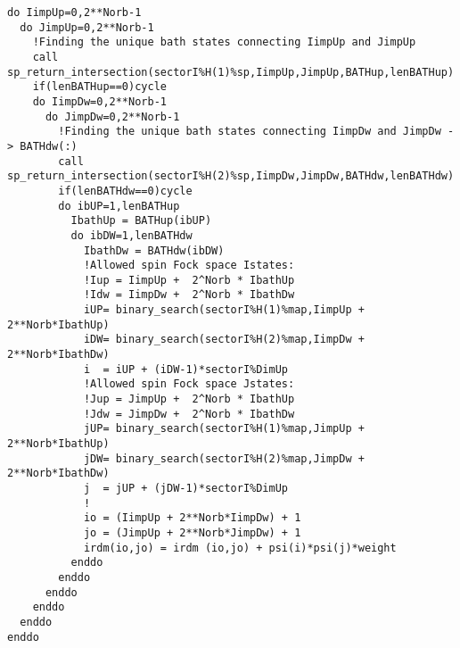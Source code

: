 \documentclass[edipack2.tex]{subfiles}
\begin{document}
\begin{lstlisting}[style=fstyle,numbers=none,basicstyle={\scriptsize\ttfamily}]
do IimpUp=0,2**Norb-1
  do JimpUp=0,2**Norb-1
    !Finding the unique bath states connecting IimpUp and JimpUp
    call sp_return_intersection(sectorI%H(1)%sp,IimpUp,JimpUp,BATHup,lenBATHup)
    if(lenBATHup==0)cycle
    do IimpDw=0,2**Norb-1
      do JimpDw=0,2**Norb-1
        !Finding the unique bath states connecting IimpDw and JimpDw -> BATHdw(:)
        call sp_return_intersection(sectorI%H(2)%sp,IimpDw,JimpDw,BATHdw,lenBATHdw)
        if(lenBATHdw==0)cycle
        do ibUP=1,lenBATHup
          IbathUp = BATHup(ibUP)
          do ibDW=1,lenBATHdw
            IbathDw = BATHdw(ibDW)
            !Allowed spin Fock space Istates:
            !Iup = IimpUp +  2^Norb * IbathUp
            !Idw = IimpDw +  2^Norb * IbathDw
            iUP= binary_search(sectorI%H(1)%map,IimpUp + 2**Norb*IbathUp)
            iDW= binary_search(sectorI%H(2)%map,IimpDw + 2**Norb*IbathDw)
            i  = iUP + (iDW-1)*sectorI%DimUp
            !Allowed spin Fock space Jstates:
            !Jup = JimpUp +  2^Norb * IbathUp
            !Jdw = JimpDw +  2^Norb * IbathDw
            jUP= binary_search(sectorI%H(1)%map,JimpUp + 2**Norb*IbathUp)
            jDW= binary_search(sectorI%H(2)%map,JimpDw + 2**Norb*IbathDw)
            j  = jUP + (jDW-1)*sectorI%DimUp
            ! 
            io = (IimpUp + 2**Norb*IimpDw) + 1
            jo = (JimpUp + 2**Norb*JimpDw) + 1
            irdm(io,jo) = irdm (io,jo) + psi(i)*psi(j)*weight
          enddo
        enddo
      enddo
    enddo
  enddo
enddo
\end{lstlisting}
\end{document}
